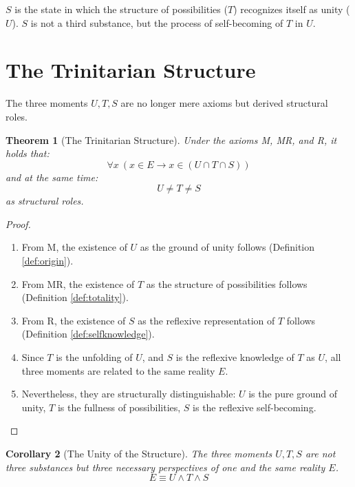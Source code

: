 \documentclass[12pt,a4paper]{article}
\newtheorem{theorem}{Theorem}[section]
\newtheorem{corollary}[theorem]{Corollary}
\begin{document}
\(S\) is the state in which the structure of possibilities (\(T\)) recognizes itself as unity (\(U\)). \(S\) is not a third substance, but the process of self-becoming of \(T\) in \(U\).

\section{The Trinitarian Structure}

The three moments \(U, T, S\) are no longer mere axioms but derived structural roles.

\begin{theorem}[The Trinitarian Structure]
\label{thm:trinity}
Under the axioms M, MR, and R, it holds that:
\begin{equation}
\forall x \ (x \in E \rightarrow x \in (U \cap T \cap S))
\end{equation}
and at the same time:
\begin{equation}
U \neq T \neq S
\end{equation}
as structural roles.
\end{theorem}

\begin{proof}
\begin{enumerate}
\item From M, the existence of \(U\) as the ground of unity follows (Definition \ref{def:origin}).
\item From MR, the existence of \(T\) as the structure of possibilities follows (Definition \ref{def:totality}).
\item From R, the existence of \(S\) as the reflexive representation of \(T\) follows (Definition \ref{def:selfknowledge}).
\item Since \(T\) is the unfolding of \(U\), and \(S\) is the reflexive knowledge of \(T\) as \(U\), all three moments are related to the same reality \(E\).
\item Nevertheless, they are structurally distinguishable: \(U\) is the pure ground of unity, \(T\) is the fullness of possibilities, \(S\) is the reflexive self-becoming.
\end{enumerate}
\end{proof}

\begin{corollary}[The Unity of the Structure]
\label{cor:unity}
The three moments \(U, T, S\) are not three substances but three necessary perspectives of one and the same reality \(E\).
\begin{equation}
E \equiv U \land T \land S
\end{equation}
\end{corollary}
\end{document}
